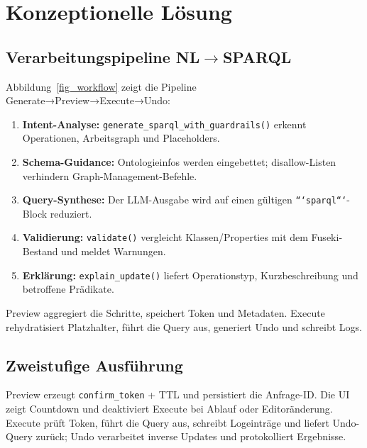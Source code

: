 \section{Konzeptionelle Lösung}

\subsection{Verarbeitungspipeline NL\texorpdfstring{$\rightarrow$}{→}SPARQL}
Abbildung~\ref{fig_workflow} zeigt die Pipeline Generate→Preview→Execute→Undo:
\begin{enumerate}
  \item \textbf{Intent-Analyse:} \texttt{generate\_sparql\_with\_guardrails()} erkennt Operationen, Arbeitsgraph und Placeholders.
  \item \textbf{Schema-Guidance:} Ontologieinfos werden eingebettet; disallow-Listen verhindern Graph-Management-Befehle.
  \item \textbf{Query-Synthese:} Der LLM-Ausgabe wird auf einen gültigen \texttt{```sparql```}-Block reduziert.
  \item \textbf{Validierung:} \texttt{validate()} vergleicht Klassen/Properties mit dem Fuseki-Bestand und meldet Warnungen.
  \item \textbf{Erklärung:} \texttt{explain\_update()} liefert Operationstyp, Kurzbeschreibung und betroffene Prädikate.
\end{enumerate}
Preview aggregiert die Schritte, speichert Token und Metadaten. Execute rehydratisiert Platzhalter, führt die Query aus, generiert Undo und schreibt Logs.

\subsection{Zweistufige Ausführung}
Preview erzeugt \texttt{confirm\_token} + TTL und persistiert die Anfrage-ID. Die UI zeigt Countdown und deaktiviert Execute bei Ablauf oder Editoränderung. Execute prüft Token, führt die Query aus, schreibt Logeinträge und liefert Undo-Query zurück; Undo verarbeitet inverse Updates und protokolliert Ergebnisse.

